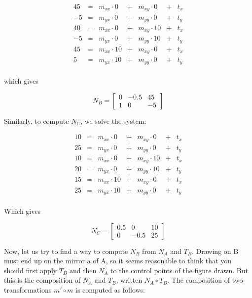 \documentclass{article}
\begin{document}
\[ \begin{array}{ccccccc}
45 & = & m_{xx} \cdot 0 & + & m_{xy} \cdot 0 & + & t_x \\
-5 & = & m_{yx} \cdot 0 & + & m_{yy} \cdot 0 & + & t_y \\
40 & = & m_{xx} \cdot 0 & + & m_{xy} \cdot 10 & + & t_x \\
-5 & = & m_{yx} \cdot 0 & + & m_{yy} \cdot 10 & + & t_y \\
45 & = & m_{xx} \cdot 10 & + & m_{xy} \cdot 0 & + & t_x \\
5 & = & m_{yx} \cdot 10 & + & m_{yy} \cdot 0 & + & t_y \\
\end{array} \]

which gives

\[ N_B = \left[ \begin{array}{ccc}
0 & -0.5 & 45\\
1 & 0 & -5 
\end{array} \right] \]

Similarly, to compute $N_C$, we solve the system:

\[ \begin{array}{ccccccc}
10 & = & m_{xx} \cdot 0 & + & m_{xy} \cdot 0 & + & t_x \\
25 & = & m_{yx} \cdot 0 & + & m_{yy} \cdot 0 & + & t_y \\
10 & = & m_{xx} \cdot 0 & + & m_{xy} \cdot 10 & + & t_x \\
20 & = & m_{yx} \cdot 0 & + & m_{yy} \cdot 10 & + & t_y \\
15 & = & m_{xx} \cdot 10 & + & m_{xy} \cdot 0 & + & t_x \\
25 & = & m_{yx} \cdot 10 & + & m_{yy} \cdot 0 & + & t_y \\
\end{array} \]

Which gives

\[ N_C = \left[ \begin{array}{ccc}
0.5 & 0 & 10\\
0 & -0.5 & 25 
\end{array} \right] \]

Now, let us try to find a way to compute $N_B$ from $N_A$ and $T_B$.
Drawing on B must end up on the mirror a of A, so it seems reasonable
to think that you should first apply $T_B$ and then $N_A$ to the
control points of the figure drawn.  But this is the composition of
$N_A$ and $T_B$, written $N_A \circ T_B$.  The composition of two
transformations $m' \circ m$ is computed as follows:
\end{document}
